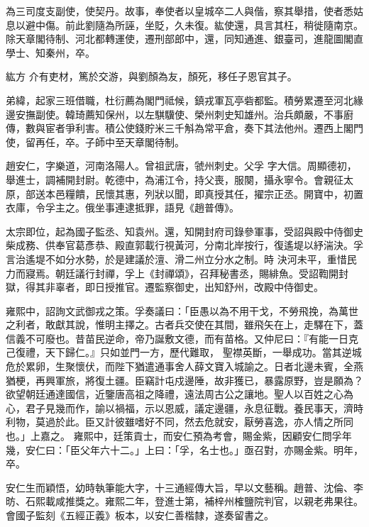 \begin{pinyinscope}
 為三司度支副使，使契丹。故事，奉使者以皇城卒二人與偕，察其舉措，使者悉姑息以避中傷。前此劉隨為所誣，坐貶，久未復。紘使還，具言其枉，稍徙隨南京。除天章閣待制、河北都轉運使，遷刑部郎中，還，同知通進、銀臺司，進龍圖閣直學士、知秦州，卒。



 紘方
 介有吏材，篤於交游，與劉顏為友，顏死，移任子恩官其子。



 弟緯，起家三班借職，杜衍薦為閣門祗候，鎮戎軍瓦亭砦都監。積勞累遷至河北緣邊安撫副使。韓琦薦知保州，以左騏驥使、榮州刺史知雄州。治兵頗嚴，不事廚傳，數與宦者爭利害。積公使錢貯米三千斛為常平倉，奏下其法他州。遷西上閣門使，留再任，卒。子師中至天章閣待制。



 趙安仁，字樂道，河南洛陽人。曾祖武唐，虢州刺史。父孚
 字大信。周顯德初，舉進士，調補開封尉。乾德中，為浦江令，持父喪，服闋，攝永寧令。會親征太原，部送本邑糧饋，民懷其惠，列狀以聞，即真授其任，擢宗正丞。開寶中，初置衣庫，令孚主之。俄坐事連逮抵罪，語見《趙普傳》。



 太宗即位，起為國子監丞、知袁州。還，知開封府司錄參軍事，受詔與殿中侍御史柴成務、供奉官葛彥恭、殿直郭載行視黃河，分南北岸按行，復遙堤以紓湍決。孚言治遙堤不如分水勢，於是建議於澶、滑二州立分水之制。時
 決河未平，重惜民力而寢焉。朝廷議行封禪，孚上《封禪頌》，召拜秘書丞，賜緋魚。受詔鞫開封獄，得其非辜者，即日授推官。遷監察御史，出知舒州，改殿中侍御史。



 雍熙中，詔詢文武御戎之策。孚奏議曰：「臣愚以為不用干戈，不勞飛挽，為萬世之利者，敢獻其說，惟明主擇之。古者兵交使在其間，雖飛矢在上，走驛在下，蓋信義不可廢也。昔苗民逆命，帝乃誕敷文德，而有苗格。又仲尼曰：『有能一日克己復禮，天下歸仁。』只如並門一方，歷代難取，
 聖襟英斷，一舉成功。當其逆城危於累卵，生聚懷伏，而陛下猶遣通事舍人薛文寶入城諭之。日者北邊未賓，全燕猶梗，再興軍旅，將復土疆。臣竊計屯戍邊陲，故非獲已，暴露原野，豈是願為？欲望朝廷通達國信，近鑒唐高祖之降禮，遠法周古公之讓地。聖人以百姓之心為心，君子見幾而作，諭以禍福，示以恩威，議定邊疆，永息征戰。養民事天，濟時利物，莫過於此。臣又計彼雖嗜好不同，然去危就安，厭勞喜逸，亦人情之所同也。」上嘉之。
 雍熙中，廷策貢士，而安仁預為考會，賜金紫，因顧安仁問孚年幾，安仁曰：「臣父年六十二。」上曰：「孚，名士也。」亟召對，亦賜金紫。明年，卒。



 安仁生而穎悟，幼時執筆能大字，十三通經傳大旨，早以文藝稱。趙普、沈倫、李昉、石熙載咸推獎之。雍熙二年，登進士第，補梓州榷鹽院判官，以親老弗果往。會國子監刻《五經正義》板本，以安仁善楷隸，遂奏留書之。




\end{pinyinscope}
